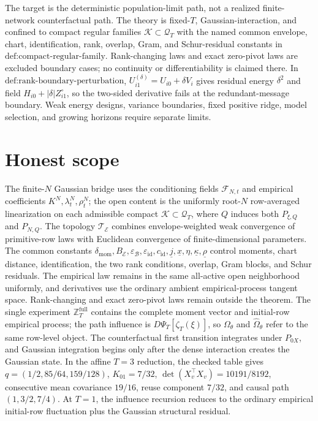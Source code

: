 \documentclass{article}
\begin{document}
The target is the deterministic population-limit path, not a realized finite-network counterfactual path. The theory is fixed-\(T\), Gaussian-interaction, and confined to compact regular families \(\mathcal K\subset\mathcal Q_T\) with the named common envelope, chart, identification, rank, overlap, Gram, and Schur-residual constants in \(\text{def:compact-regular-family}\). Rank-changing laws and exact zero-pivot laws are excluded boundary cases; no continuity or differentiability is claimed there. In \(\text{def:rank-boundary-perturbation}\), \(U_{i1}^{(\delta)}=U_{i0}+\delta V_i\) gives residual energy \(\delta^2\) and field \(H_{i0}+|\delta|Z_{i1}^{\circ}\), so the two-sided derivative fails at the redundant-message boundary. Weak energy designs, variance boundaries, fixed positive ridge, model selection, and growing horizons require separate limits.

\section{Honest scope}

The finite-\(N\) Gaussian bridge uses the conditioning fields \(\mathscr F_{N,t}\) and empirical coefficients \(K^N,\lambda_t^N,\rho_t^N\); the open content is the uniformly root-\(N\) row-averaged linearization on each admissible compact \(\mathcal K\subset\mathcal Q_T\), where \(Q\) induces both \(P_{\xi,Q}\) and \(P_{N,Q}\). The topology \(\mathcal T_{\mathcal E}\) combines envelope-weighted weak convergence of primitive-row laws with Euclidean convergence of finite-dimensional parameters. The common constants \(\delta_{\mathrm{mom}},B_{\mathcal E},\varepsilon_{\mathcal B},\varepsilon_{\mathrm{id}},c_{\mathrm{id}},\underline j,\underline x,\eta,\underline\kappa,\underline\rho\) control moments, chart distance, identification, the two rank conditions, overlap, Gram blocks, and Schur residuals. The empirical law remains in the same all-active open neighborhood uniformly, and derivatives use the ordinary ambient empirical-process tangent space. Rank-changing and exact zero-pivot laws remain outside the theorem. The single experiment \(\mathbb Z_T^{\mathrm{full}}\) contains the complete moment vector and initial-row empirical process; the path influence is \(D\Psi_T[\zeta_T(\xi)]\), so \(\Omega_\theta\) and \(\widehat\Omega_\theta\) refer to the same row-level object. The counterfactual first transition integrates under \(P_{0X}\), and Gaussian integration begins only after the dense interaction creates the Gaussian state. In the affine \(T=3\) reduction, the checked table gives \(q=(1/2,85/64,159/128)\), \(K_{01}=7/32\), \(\det(X_v^{\top}X_v)=10191/8192\), consecutive mean covariance \(19/16\), reuse component \(7/32\), and causal path \((1,3/2,7/4)\). At \(T=1\), the influence recursion reduces to the ordinary empirical initial-row fluctuation plus the Gaussian structural residual.
\end{document}
